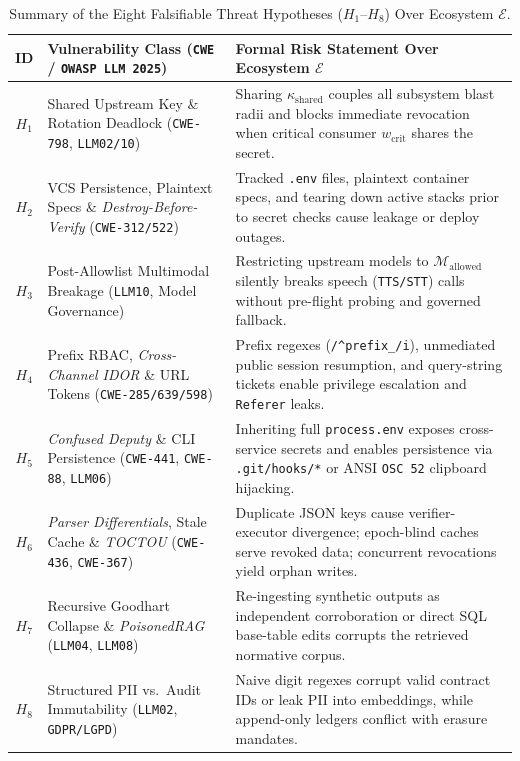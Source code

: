 \documentclass[10pt,twocolumn]{article}
\begin{document}
\begin{table}[t]
\centering
\caption{Summary of the Eight Falsifiable Threat Hypotheses ($H_1$--$H_8$) Over Ecosystem $\mathcal{E}$.}
\label{tab:hypotheses}
\footnotesize
\begin{tabularx}{\textwidth}{@{}c l Y@{}}
\toprule
\textbf{ID} & \textbf{Vulnerability Class (\texttt{CWE} / \texttt{OWASP LLM 2025})} & \textbf{Formal Risk Statement Over Ecosystem $\mathcal{E}$} \\
\midrule
$H_1$ & Shared Upstream Key \& Rotation Deadlock (\texttt{CWE-798}, \texttt{LLM02/10}) & Sharing $\kappa_{\mathrm{shared}}$ couples all subsystem blast radii and blocks immediate revocation when critical consumer $w_{\mathrm{crit}}$ shares the secret. \\
\addlinespace[2pt]
$H_2$ & VCS Persistence, Plaintext Specs \& \emph{Destroy-Before-Verify} (\texttt{CWE-312/522}) & Tracked \texttt{.env} files, plaintext container specs, and tearing down active stacks prior to secret checks cause leakage or deploy outages. \\
\addlinespace[2pt]
$H_3$ & Post-Allowlist Multimodal Breakage (\texttt{LLM10}, Model Governance) & Restricting upstream models to $\mathcal{M}_{\mathrm{allowed}}$ silently breaks speech (\texttt{TTS/STT}) calls without pre-flight probing and governed fallback. \\
\addlinespace[2pt]
$H_4$ & Prefix RBAC, \emph{Cross-Channel IDOR} \& URL Tokens (\texttt{CWE-285/639/598}) & Prefix regexes (\texttt{/\^{}prefix\_/i}), unmediated public session resumption, and query-string tickets enable privilege escalation and \texttt{Referer} leaks. \\
\addlinespace[2pt]
$H_5$ & \emph{Confused Deputy} \& CLI Persistence (\texttt{CWE-441}, \texttt{CWE-88}, \texttt{LLM06}) & Inheriting full \texttt{process.env} exposes cross-service secrets and enables persistence via \texttt{.git/hooks/*} or ANSI \texttt{OSC 52} clipboard hijacking. \\
\addlinespace[2pt]
$H_6$ & \emph{Parser Differentials}, Stale Cache \& \emph{TOCTOU} (\texttt{CWE-436}, \texttt{CWE-367}) & Duplicate JSON keys cause verifier-executor divergence; epoch-blind caches serve revoked data; concurrent revocations yield orphan writes. \\
\addlinespace[2pt]
$H_7$ & Recursive Goodhart Collapse \& \emph{PoisonedRAG} (\texttt{LLM04}, \texttt{LLM08}) & Re-ingesting synthetic outputs as independent corroboration or direct SQL base-table edits corrupts the retrieved normative corpus. \\
\addlinespace[2pt]
$H_8$ & Structured PII vs.\ Audit Immutability (\texttt{LLM02}, \texttt{GDPR/LGPD}) & Naive digit regexes corrupt valid contract IDs or leak PII into embeddings, while append-only ledgers conflict with erasure mandates. \\
\bottomrule
\end{tabularx}
\end{table}
\end{document}
